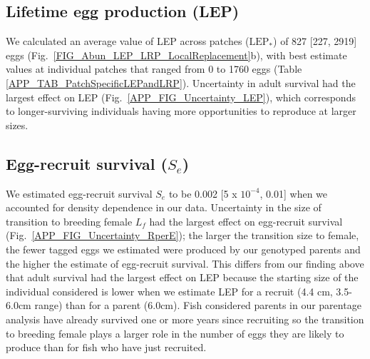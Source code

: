 \documentclass[12pt, oneside]{article}   	%
\begin{document}
\subsection{Lifetime egg production (LEP)} \label{APP_SEC_RESULTS_LEP}  %
We calculated an average value of LEP across patches ($\text{LEP}_*$) of 827 [227, 2919] eggs (Fig.\ \ref{FIG_Abun_LEP_LRP_LocalReplacement}b), with best estimate values at individual patches that ranged from 0 to 1760 eggs (Table \ref{APP_TAB_PatchSpecificLEPandLRP}). Uncertainty in adult survival had the largest effect on LEP (Fig.\ \ref{APP_FIG_Uncertainty_LEP}), which corresponds to longer-surviving individuals having more opportunities to reproduce at larger sizes. 

\subsection{Egg-recruit survival ($S_e$)} \label{APP_SEC_RESULTS_Egg-recruit_survival}  %

We estimated egg-recruit survival $S_{e}$ to be 0.002 [5 x $10^{-4}$, 0.01] when we accounted for density dependence in our data. Uncertainty in the size of transition to breeding female $L_f$ had the largest effect on egg-recruit survival (Fig.\ \ref{APP_FIG_Uncertainty_RperE}); the larger the transition size to female, the fewer tagged eggs we estimated were produced by our genotyped parents and the higher the estimate of egg-recruit survival. This differs from our finding above that adult survival had the largest effect on LEP because the starting size of the individual considered is lower when we estimate LEP for a recruit (4.4 cm, 3.5-6.0cm range) than for a parent (6.0cm). Fish considered parents in our parentage analysis have already survived one or more years since recruiting so the transition to breeding female plays a larger role in the number of eggs they are likely to produce than for fish who have just recruited. 

\end{document}
